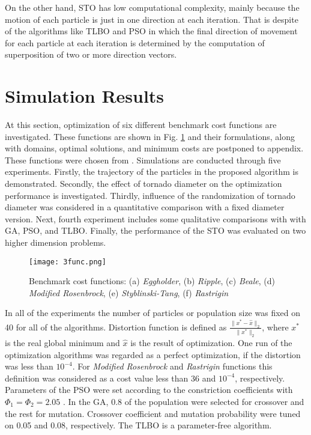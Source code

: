 \documentclass[conference]{IEEEtran}
\begin{document}
On the other hand, STO has low computational complexity, mainly because the motion of each particle is just in one direction at each iteration. That is despite of the algorithms like TLBO and PSO in which the final direction of movement for each particle at each iteration is determined by the computation of superposition of two or more direction vectors.


\section{Simulation Results}

At this section, optimization of six different benchmark cost functions are investigated. These functions are shown in Fig. \ref{Rast2} and their formulations, along with domains, optimal solutions, and minimum costs are postponed to appendix. These functions were chosen from \cite{MJ13}. Simulations are conducted through five experiments. Firstly, the trajectory of the particles in the proposed algorithm is demonstrated. Secondly, the effect of tornado diameter on the optimization performance is investigated. Thirdly, influence of the randomization of tornado diameter was considered in a quantitative comparison with a fixed diameter version. Next, fourth experiment includes some qualitative comparisons with with GA, PSO, and TLBO. Finally, the performance of the STO was evaluated on two higher dimension problems.

\begin{figure}[h!]
 \centering
  \texttt{[image: 3func.png]}
  \caption{Benchmark cost functions: (a) \emph{Eggholder}, (b) \emph{Ripple}, (c) \emph{Beale}, (d) \emph{Modified Rosenbrock}, (e) \emph{Styblinski-Tang}, (f) \emph{Rastrigin}}
  \label{Rast2}
\end{figure}

In all of the experiments the number of particles or population size was fixed on 40 for all of the algorithms. Distortion function is defined as $\frac{\|x^\ast-\hat{x}\|_2}{\|x^\ast\|_2}$, where $x^\ast$ is the real global minimum and $\hat{x}$ is the result of optimization. One run of the optimization algorithms was regarded as a perfect optimization, if the distortion was less than $10^{-4}$. For \emph{Modified Rosenbrock} and \emph{Rastrigin} functions this definition was considered as a cost value less than 36 and $10^{-4}$, respectively. Parameters of the PSO were set according to the constriction coefficients with $\Phi_1=\Phi_2=2.05$ \cite{Kennedy02}. In the GA, 0.8 of the population were selected for crossover and the rest for mutation. Crossover coefficient and mutation probability were tuned on 0.05 and 0.08, respectively. The TLBO is a parameter-free algorithm.
\end{document}
